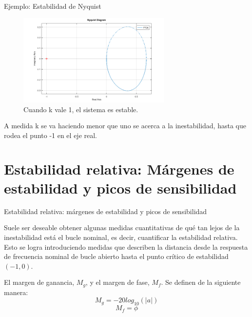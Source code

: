 \documentclass{beamer}
\begin{document}
\begin{frame}{Ejemplo: Estabilidad de Nyquist}
\begin{justify}
\begin{itemize}
  \begin{figure}[H]
    \centering
    \includegraphics[width=3in]{imagenes/NyquistK1.png}
    \caption{Cuando k vale 1, el sistema es estable.}
    \label{niquist-function}
    \end{figure}
    A medida k se va haciendo menor que uno se acerca a la inestabilidad, hasta que rodea el punto -1 en el eje real.
\end{itemize}
\end{justify}
\end{frame}

\section{Estabilidad relativa: Márgenes de estabilidad y picos de sensibilidad}
\begin{frame}{Estabilidad relativa: márgenes de estabilidad y picos de sensibilidad}
\begin{justify}
\begin{itemize}
\justifying
  Suele ser deseable obtener algunas medidas cuantitativas de qué tan lejos de la inestabilidad está el bucle nominal, es decir, cuantificar la estabilidad relativa. Esto se logra introduciendo medidas que describen la distancia desde la respuesta de frecuencia nominal de bucle abierto hasta el punto crítico de estabilidad $(-1, 0)$.
  
  El margen de ganancia, $M_g$, y el margen de fase, $M_f$. Se definen de la siguiente manera:
   \begin{equation} \label{margeng1}
    M_g=-20log_{10}(\left | a \right |)
    \end{equation}
   \begin{equation} \label{margeng2}
     M_f=\phi
    \end{equation}
   
\end{itemize}
\end{justify}
\end{frame}
\end{document}
